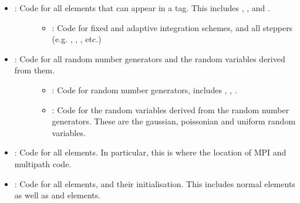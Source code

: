 \documentclass[letterpaper,10pt,english]{sphinxmanual}
\begin{document}
\begin{itemize}
\begin{description}
\begin{itemize}
\item {} \begin{description}
\item[{: Code for all elements that can appear in a  tag.  This includes , , and .}] \leavevmode\begin{itemize}
\item {} 
\sphinxAtStartPar
{}: Code for fixed and adaptive integration schemes, and all steppers (e.g. , , , etc.)

\end{itemize}

\end{description}

\item {} \begin{description}
\item[{: Code for all random number generators and the random variables derived from them.}] \leavevmode\begin{itemize}
\item {} 
\sphinxAtStartPar
{}: Code for random number generators, includes , , .

\item {} 
\sphinxAtStartPar
{}: Code for the random variables derived from the random number generators.  These are the gaussian, poissonian and uniform random variables.

\end{itemize}

\end{description}

\item {} 
\sphinxAtStartPar
{}: Code for all  elements.  In particular, this is where the location of MPI and multi\sphinxhyphen{}path code.

\item {} 
\sphinxAtStartPar
{}: Code for all  elements, and their initialisation.  This includes normal  elements as well as  and  elements.


\end{itemize}
\end{description}
\end{itemize}
\end{document}
